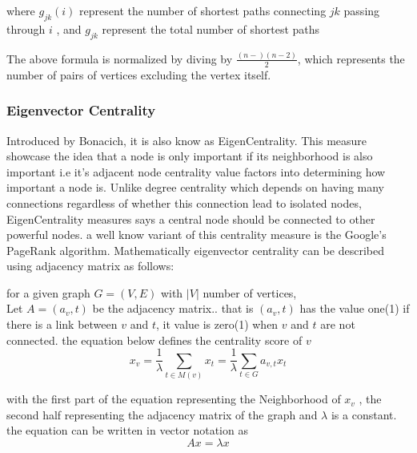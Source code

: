 where
${g_{jk}(i)  }$ represent the number of shortest paths connecting ${jk}$ passing through ${i}$ , and ${g_{jk} }$ represent the total number of shortest paths

The above formula is normalized by diving by ${\frac{(n-)(n-2)}{2}}$, which represents the number of pairs of vertices excluding the vertex itself.

\subsubsection{Eigenvector Centrality}
Introduced by Bonacich, it is also know as EigenCentrality. This measure showcase the idea that a node is only important if its neighborhood is also important i.e it's adjacent node centrality value factors into determining how important a node is. Unlike degree centrality which depends on having many connections regardless of whether this connection lead to isolated nodes, EigenCentrality measures says a central node should be connected to other powerful nodes.  a  well know variant of this centrality measure is the Google's PageRank algorithm. Mathematically eigenvector centrality can be described using adjacency matrix as follows: 

for a given graph ${G = (V, E)}$ with ${|V|}$ number of vertices, \\
Let ${A = (a_v, t)}$ be the adjacency matrix.. that is ${ (a_v, t)}$ has the value one(1) if there is a link between ${v}$ and ${t}$, it value is zero(1) when ${v}$ and ${t}$ are not connected. 
the equation below defines the centrality score of ${v}$
$${x_v = \frac{1}{\lambda} \sum_{t \in M(v) }^{}  x_t = \frac{1}{\lambda} \sum_{t \in G }^{} a_{v, t} x_t}$$

with the first part of the equation representing the Neighborhood of ${x_v}$ , the second half representing the adjacency matrix of the graph and ${\lambda}$ is a constant. the equation can be written in vector notation as
$${Ax = \lambda x}$$


